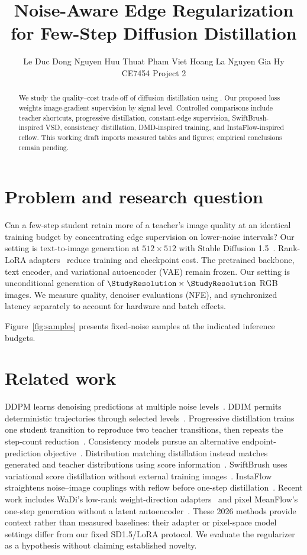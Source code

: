 \documentclass[10pt,twocolumn,letterpaper]{article}
\title{Noise-Aware Edge Regularization for Few-Step Diffusion Distillation}
\author{Le Duc Dong \quad Nguyen Huu Thuat \quad Pham Viet Hoang \quad La Nguyen Gia Hy\\CE7454 Project 2}
\begin{document}
\maketitle

\begin{abstract}
We study the quality--cost trade-off of diffusion distillation using
\StudyDataset{}. Our proposed loss weights image-gradient supervision by
signal level. Controlled comparisons include teacher shortcuts, progressive
distillation, constant-edge supervision, SwiftBrush-inspired VSD, consistency
distillation, DMD-inspired training, and InstaFlow-inspired reflow. This working draft imports measured
tables and figures; empirical conclusions remain pending.
\end{abstract}

\section{Problem and research question}
Can a few-step student retain more of a teacher's image quality at an identical
training budget by concentrating edge supervision on lower-noise intervals?
\ifStudySD
Our setting is text-to-image generation at $512\times512$ with Stable Diffusion
1.5~\cite{rombach2022ldm}. Rank-\StudyLoRARank{} LoRA adapters~\cite{hu2022lora}
reduce training and checkpoint cost. The pretrained backbone, text encoder,
and variational autoencoder (VAE) remain frozen.
\else
Our setting is unconditional generation of $\StudyResolution\times\StudyResolution$ RGB
\StudyDataset{} images.
\fi
We measure quality, denoiser evaluations (NFE), and synchronized latency
separately to account for hardware and batch effects.

Figure~\ref{fig:samples} presents fixed-noise samples at the indicated inference budgets.


\section{Related work}
DDPM learns denoising predictions at multiple noise levels~\cite{ho2020ddpm}.
DDIM permits deterministic trajectories through selected levels~\cite{song2021ddim}.
Progressive distillation trains one student transition to reproduce two teacher
transitions, then repeats the step-count reduction~\cite{salimans2022progressive}.
Consistency models pursue an alternative endpoint-prediction
objective~\cite{song2023consistency}. Distribution matching distillation instead
matches generated and teacher distributions using score
information~\cite{yin2024dmd}. SwiftBrush uses variational score distillation
without external training images~\cite{nguyen2024swiftbrush}.
InstaFlow straightens noise--image couplings with reflow before one-step
distillation~\cite{liu2024instaflow}. Recent work includes WaDi's low-rank
weight-direction adapters~\cite{wang2026wadi} and pixel MeanFlow's one-step
generation without a latent autoencoder~\cite{lu2026pixelmeanflow}. These
2026 methods provide context rather than measured baselines: their adapter or
pixel-space model settings differ from our fixed SD1.5/LoRA protocol.
We evaluate the regularizer as a hypothesis without claiming established novelty.
\end{document}
